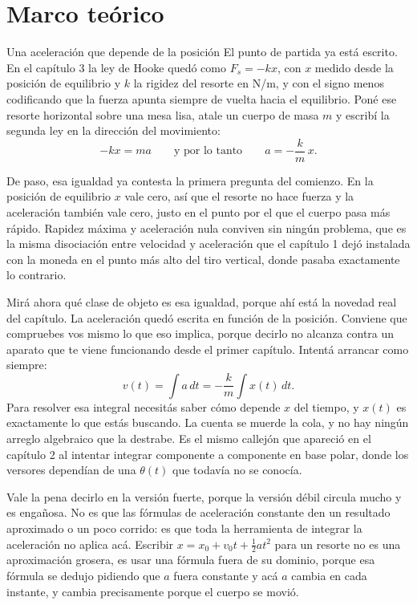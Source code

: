 \documentclass[11pt,openany]{book}
\begin{document}
\section{Marco teórico}

\begin{bloque}{Una aceleración que depende de la posición}
El punto de partida ya está escrito. En el capítulo 3 la ley de Hooke quedó como $F_s = -kx$, con $x$ medido desde la posición de equilibrio y $k$ la rigidez del resorte en N/m, y con el signo menos codificando que la fuerza apunta siempre de vuelta hacia el equilibrio. Poné ese resorte horizontal sobre una mesa lisa, atale un cuerpo de masa $m$ y escribí la segunda ley en la dirección del movimiento:
\[
-kx = ma
\qquad\text{y por lo tanto}\qquad
a = -\frac{k}{m}\,x .
\]

De paso, esa igualdad ya contesta la primera pregunta del comienzo. En la posición de equilibrio $x$ vale cero, así que el resorte no hace fuerza y la aceleración también vale cero, justo en el punto por el que el cuerpo pasa más rápido. Rapidez máxima y aceleración nula conviven sin ningún problema, que es la misma disociación entre velocidad y aceleración que el capítulo 1 dejó instalada con la moneda en el punto más alto del tiro vertical, donde pasaba exactamente lo contrario.

Mirá ahora qué clase de objeto es esa igualdad, porque ahí está la novedad real del capítulo. La aceleración quedó escrita en función de la posición. Conviene que compruebes vos mismo lo que eso implica, porque decirlo no alcanza contra un aparato que te viene funcionando desde el primer capítulo. Intentá arrancar como siempre:
\[
v(t) = \int a\,dt = -\frac{k}{m}\int x(t)\,dt .
\]
Para resolver esa integral necesitás saber cómo depende $x$ del tiempo, y $x(t)$ es exactamente lo que estás buscando. La cuenta se muerde la cola, y no hay ningún arreglo algebraico que la destrabe. Es el mismo callejón que apareció en el capítulo 2 al intentar integrar componente a componente en base polar, donde los versores dependían de una $\theta(t)$ que todavía no se conocía.

Vale la pena decirlo en la versión fuerte, porque la versión débil circula mucho y es engañosa. No es que las fórmulas de aceleración constante den un resultado aproximado o un poco corrido: es que toda la herramienta de integrar la aceleración no aplica acá. Escribir $x = x_0 + v_0 t + \tfrac12 a t^2$ para un resorte no es una aproximación grosera, es usar una fórmula fuera de su dominio, porque esa fórmula se dedujo pidiendo que $a$ fuera constante y acá $a$ cambia en cada instante, y cambia precisamente porque el cuerpo se movió.


\end{bloque}
\end{document}
